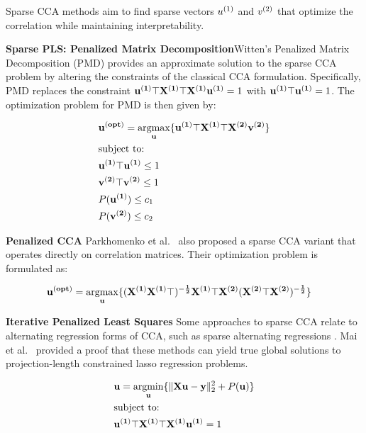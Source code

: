 Sparse CCA methods aim to find sparse vectors \(u^{(1)}\) and \(v^{(2)}\) that optimize the correlation while maintaining interpretability.

\textbf{Sparse PLS: Penalized Matrix Decomposition}Witten's Penalized Matrix Decomposition (PMD) \cite{
    witten2009penalized} provides an approximate solution to the sparse CCA problem by altering the constraints of the classical CCA formulation.
Specifically, PMD replaces the constraint \(\bold{u^{(1)}\top X^{(1)}\top X^{(1)} u^{(1)}}=1\) with \(\bold{u^{(1)}\top u^{(1)}}=1\).
The optimization problem for PMD is then given by:

\begin{align}
    \label{eq:pmd}
    & \bold{u^{(opt)}}=\underset{\bold{u}}{\mathrm{argmax}}\{ \bold{u^{(1)}\top X^{(1)}\top X^{(2)} v^{(2)}} \} \\
    & \text{subject to:} \notag \\
    & \bold{u^{(1)}\top u^{(1)}} \leq 1 \notag \\
    & \bold{v^{(2)}\top v^{(2)}} \leq 1 \notag \\
    & P(\bold{u^{(1)}}) \leq c_1 \notag \\
    & P(\bold{v^{(2)}}) \leq c_2 \notag
\end{align}

\textbf{Penalized CCA} Parkhomenko et al.\ \cite{parkhomenko2009sparse} also proposed a sparse CCA variant that
operates directly on correlation matrices.
Their optimization problem is formulated as:

\begin{align}
    \label{eq:parkho}
    & \bold{u^{(opt)}}=\underset{\bold{u}}{\mathrm{argmax}}\{ \bold{(X^{(1)}X^{(1)}\top)^{-\frac{1}{2}}X^{(1)}\top X^{(2)}(X^{(2)}\top X^{(2)})^{-\frac{1}{2}}} \}
\end{align}

\textbf{Iterative Penalized Least Squares} Some approaches to sparse CCA relate to alternating regression forms of
CCA, such as sparse alternating regressions \cite{wilms2015sparse}. Mai et al.\ \cite{mai2019iterative} provided a proof that these methods can yield true global solutions to projection-length constrained lasso regression problems.

\begin{align}
    \label{eq:mai}
    & \bold{u}=\underset{\bold{u}}{\mathrm{argmin}}\{ \|\bold{Xu-y}\|^2_2 + P(\bold{u}) \} \\
    & \text{subject to:} \notag \\
    & \bold{u^{(1)}\top X^{(1)}\top X^{(1)} u^{(1)}}=1 \notag
\end{align}


